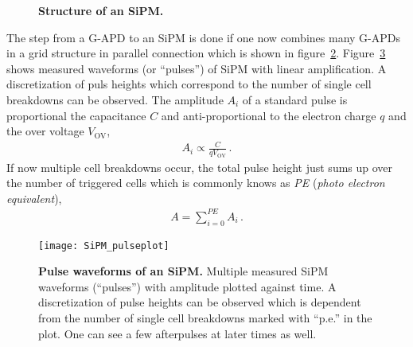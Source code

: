 \begin{figure}[H]
	\centering
	\begin{subfigure}[t]{0.62\textwidth}
		\label{sipm:iceact_sipm}
	\end{subfigure}
	\hfill
	\begin{subfigure}[t]{0.34\textwidth}
		\usebox{\savedimage}
	\end{subfigure}
	\caption[Structure of an SiPM]{\textbf{Structure of an SiPM.} \cite{sipm:datasheet}}
	\label{sipm:circuit_picture}
\end{figure}

The step from a G-APD to an SiPM is done if one now combines many G-APDs in a grid structure in parallel connection which is shown in figure~\ref{sipm:circuit_picture}. Figure~\ref{sipm:pulses} shows measured waveforms (or \enquote{pulses}) of SiPM with linear amplification. A discretization of puls heights which correspond to the number of single cell breakdowns can be observed. The amplitude $A_i$ of a standard pulse is proportional the capacitance $C$ and anti-proportional to the electron charge $q$ and the over voltage $V_\text{OV}$,~\cite{sipm:renker_lorenz}
\begin{align}
	A_i\propto\frac{C}{qV_\text{OV}}\,.
\end{align}
If now multiple cell breakdowns occur, the total pulse height just sums up over the number of triggered cells which is commonly knows as \textit{PE} (\textit{photo electron equivalent}),~\cite{sipm:renker_lorenz}
\begin{align} 
	A = \sum_{i=0}^{PE} A_i\,.
\end{align}

\begin{figure}[H]
	\centering
	\texttt{[image: SiPM\_pulseplot]}
	\caption[Pulse waveforms of an SiPM]{\textbf{Pulse waveforms of an SiPM.} \cite{sipm:hamamatsu_handbook} Multiple measured SiPM waveforms (\enquote{pulses}) with amplitude plotted against time. A discretization of pulse heights can be observed which is dependent from the number of single cell breakdowns marked with \enquote{p.e.} in the plot. One can see a few afterpulses at later times as well.}
	\label{sipm:pulses}
\end{figure}

